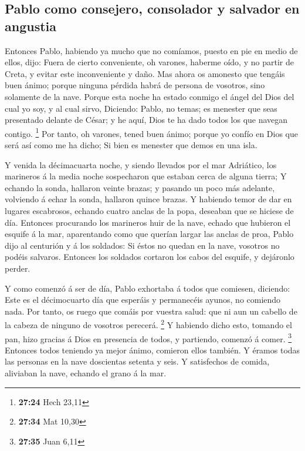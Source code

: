 \hypertarget{pablo-como-consejero-consolador-y-salvador-en-angustia}{%
\subsection{Pablo como consejero, consolador y salvador en
angustia}\label{pablo-como-consejero-consolador-y-salvador-en-angustia}}

 Entonces Pablo, habiendo ya mucho que no comíamos,
puesto en pie en medio de ellos, dijo: Fuera de cierto conveniente, oh
varones, haberme oído, y no partir de Creta, y evitar este inconveniente
y daño.  Mas ahora os amonesto que tengáis buen ánimo;
porque ninguna pérdida habrá de persona de vosotros, sino solamente de
la nave.  Porque esta noche ha estado conmigo el ángel
del Dios del cual yo soy, y al cual sirvo,  Diciendo:
Pablo, no temas; es menester que seas presentado delante de César; y he
aquí, Dios te ha dado todos los que navegan contigo. \footnote{\textbf{27:24}
  Hech 23,11}  Por tanto, oh varones, tened buen ánimo;
porque yo confío en Dios que será así como me ha dicho; 
Si bien es menester que demos en una isla.

 Y venida la décimacuarta noche, y siendo llevados por el
mar Adriático, los marineros á la media noche sospecharon que estaban
cerca de alguna tierra;  Y echando la sonda, hallaron
veinte brazas; y pasando un poco más adelante, volviendo á echar la
sonda, hallaron quince brazas.  Y habiendo temor de dar
en lugares escabrosos, echando cuatro anclas de la popa, deseaban que se
hiciese de día.  Entonces procurando los marineros huir
de la nave, echado que hubieron el esquife á la mar, aparentando como
que querían largar las anclas de proa,  Pablo dijo al
centurión y á los soldados: Si éstos no quedan en la nave, vosotros no
podéis salvaros.  Entonces los soldados cortaron los
cabos del esquife, y dejáronlo perder.

 Y como comenzó á ser de día, Pablo exhortaba á todos que
comiesen, diciendo: Este es el décimocuarto día que esperáis y
permanecéis ayunos, no comiendo nada.  Por tanto, os
ruego que comáis por vuestra salud: que ni aun un cabello de la cabeza
de ninguno de vosotros perecerá. \footnote{\textbf{27:34} Mat 10,30}
 Y habiendo dicho esto, tomando el pan, hizo gracias á
Dios en presencia de todos, y partiendo, comenzó á comer. \footnote{\textbf{27:35}
  Juan 6,11}  Entonces todos teniendo ya mejor ánimo,
comieron ellos también.  Y éramos todas las personas en
la nave doscientas setenta y seis.  Y satisfechos de
comida, aliviaban la nave, echando el grano á la mar.

